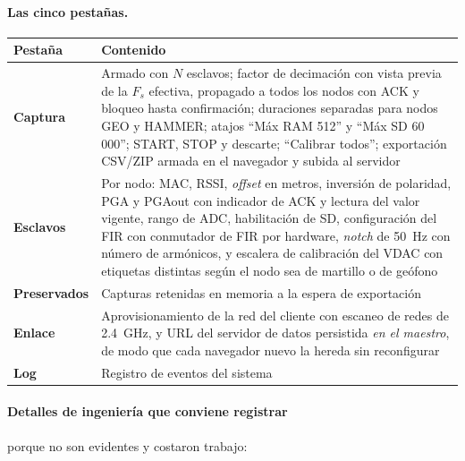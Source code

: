 \paragraph{Las cinco pesta\~nas.}

\begin{center}\footnotesize
\begin{tabularx}{\textwidth}{@{}l X@{}}
\toprule
Pesta\~na & Contenido \\
\midrule
\textbf{Captura} & Armado con $N$ esclavos; factor de decimaci\'on con vista previa de la $F_s$ efectiva, propagado a todos los nodos con ACK y bloqueo hasta confirmaci\'on; duraciones separadas para nodos GEO y HAMMER; atajos ``M\'ax RAM 512'' y ``M\'ax SD 60\,000''; START, STOP y descarte; ``Calibrar todos''; exportaci\'on CSV/ZIP armada en el navegador y subida al servidor \\
\textbf{Esclavos} & Por nodo: MAC, RSSI, \emph{offset} en metros, inversi\'on de polaridad, PGA y PGAout con indicador de ACK y lectura del valor vigente, rango de ADC, habilitaci\'on de SD, configuraci\'on del FIR con conmutador de FIR por hardware, \emph{notch} de \SI{50}{\hertz} con n\'umero de arm\'onicos, y escalera de calibraci\'on del VDAC con etiquetas distintas seg\'un el nodo sea de martillo o de ge\'ofono \\
\textbf{Preservados} & Capturas retenidas en memoria a la espera de exportaci\'on \\
\textbf{Enlace} & Aprovisionamiento de la red del cliente con escaneo de redes de \SI{2.4}{\giga\hertz}, y URL del servidor de datos persistida \emph{en el maestro}, de modo que cada navegador nuevo la hereda sin reconfigurar \\
\textbf{Log} & Registro de eventos del sistema \\
\bottomrule
\end{tabularx}
\end{center}

\paragraph{Detalles de ingenier\'ia que conviene registrar} porque no son evidentes y
costaron trabajo:

